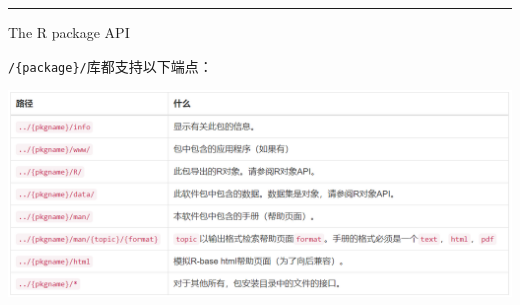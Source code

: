 \documentclass[]{book}
\begin{document}
\begin{center}\rule{0.5\linewidth}{\linethickness}\end{center}

The R package API

\texttt{/\{package\}/}库都支持以下端点：

\includegraphics{pic/opencpu/p4.png}
\end{document}
